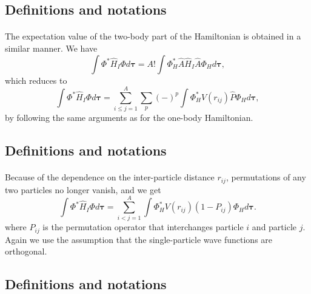\documentclass[%
twoside,                 %
final,                   %
10pt]{article}
\begin{document}
\subsection*{Definitions and notations}

\paragraph{}
The expectation value of the two-body part of the Hamiltonian is obtained in a
similar manner. We have
\[
  \int \Phi^*\hat{H}_I\Phi d\mathbf{\tau} 
  = A! \int \Phi_H^*\hat{A}\hat{H}_I\hat{A}\Phi_H d\mathbf{\tau},
\]
which reduces to
\[
 \int \Phi^*\hat{H}_I\Phi d\mathbf{\tau} 
  = \sum_{i\le j=1}^A \sum_{p} (-)^p\int 
  \Phi_H^*V(r_{ij})\hat{P}\Phi_H d\mathbf{\tau},
\]
by following the same arguments as for the one-body
Hamiltonian.



\subsection*{Definitions and notations}

\paragraph{}
Because of the dependence on the inter-particle distance $r_{ij}$,  permutations of
any two particles no longer vanish, and we get
\[
  \int \Phi^*\hat{H}_I\Phi d\mathbf{\tau} 
  = \sum_{i < j=1}^A \int  
  \Phi_H^*V(r_{ij})(1-P_{ij})\Phi_H d\mathbf{\tau}.
\]
where $P_{ij}$ is the permutation operator that interchanges
particle $i$ and particle $j$. Again we use the assumption that the single-particle wave functions
are orthogonal.




\subsection*{Definitions and notations}

\end{document}
